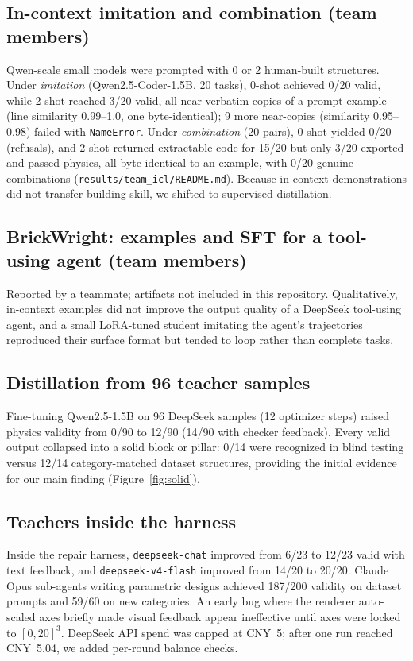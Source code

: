 \documentclass{article}
\begin{document}
\subsection{In-context imitation and combination (team members)}
\label{ex:icl}
Qwen-scale small models were prompted with 0 or 2 human-built structures. Under \emph{imitation} (Qwen2.5-Coder-1.5B, 20 tasks), 0-shot achieved 0/20 valid, while 2-shot reached 3/20 valid, all near-verbatim copies of a prompt example (line similarity 0.99--1.0, one byte-identical); 9 more near-copies (similarity 0.95--0.98) failed with \texttt{NameError}. Under \emph{combination} (20 pairs), 0-shot yielded 0/20 (refusals), and 2-shot returned extractable code for 15/20 but only 3/20 exported and passed physics, all byte-identical to an example, with 0/20 genuine combinations (\texttt{results/team\_icl/README.md}). Because in-context demonstrations did not transfer building skill, we shifted to supervised distillation.

\subsection{BrickWright: examples and SFT for a tool-using agent (team members)}
\label{ex:brickwright}
Reported by a teammate; artifacts not included in this repository. Qualitatively, in-context examples did not improve the output quality of a DeepSeek tool-using agent, and a small LoRA-tuned student imitating the agent's trajectories reproduced their surface format but tended to loop rather than complete tasks.

\subsection{Distillation from 96 teacher samples}
\label{ex:distill}
Fine-tuning Qwen2.5-1.5B on 96 DeepSeek samples (12 optimizer steps) raised physics validity from 0/90 to 12/90 (14/90 with checker feedback). Every valid output collapsed into a solid block or pillar: 0/14 were recognized in blind testing versus 12/14 category-matched dataset structures, providing the initial evidence for our main finding (Figure~\ref{fig:solid}).

\subsection{Teachers inside the harness}
\label{ex:teachers}
Inside the repair harness, \texttt{deepseek-chat} improved from 6/23 to 12/23 valid with text feedback, and \texttt{deepseek-v4-flash} improved from 14/20 to 20/20. Claude Opus sub-agents writing parametric designs achieved 187/200 validity on dataset prompts and 59/60 on new categories. An early bug where the renderer auto-scaled axes briefly made visual feedback appear ineffective until axes were locked to $[0,20]^3$. DeepSeek API spend was capped at CNY~5; after one run reached CNY~5.04, we added per-round balance checks.
\end{document}
